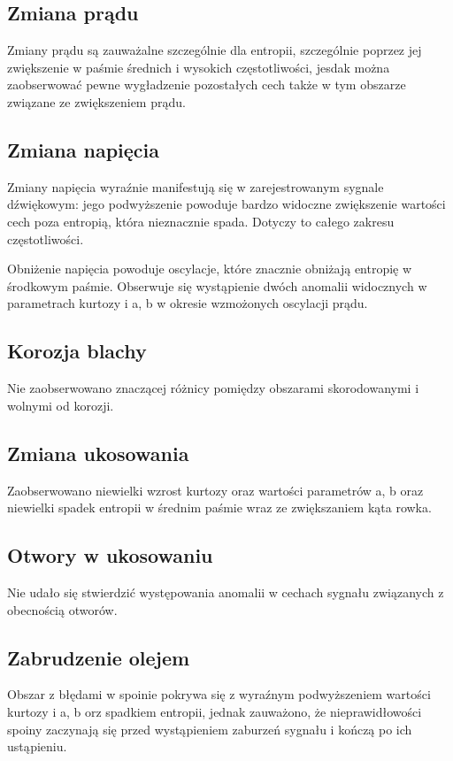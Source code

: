 \documentclass{mwart}
\begin{document}
	\subsection{Zmiana prądu}
Zmiany prądu są zauważalne szczególnie dla entropii, szczególnie poprzez jej zwiększenie w paśmie średnich i wysokich częstotliwości, jesdak można zaobserwować pewne wygładzenie pozostałych cech także w tym obszarze związane ze zwiększeniem prądu.
	
	
	\subsection{Zmiana napięcia}
	Zmiany napięcia wyraźnie manifestują się w zarejestrowanym sygnale dźwiękowym: jego podwyższenie powoduje bardzo widoczne zwiększenie wartości cech poza entropią, która nieznacznie spada. Dotyczy to całego zakresu częstotliwości.
	
	Obniżenie napięcia powoduje oscylacje, które znacznie obniżają entropię w środkowym paśmie. Obserwuje się wystąpienie dwóch anomalii widocznych w parametrach kurtozy i a, b w okresie wzmożonych oscylacji prądu.
	
	
	\subsection{Korozja blachy}
	Nie zaobserwowano znaczącej różnicy pomiędzy obszarami skorodowanymi i wolnymi od korozji.
	
	
	\subsection{Zmiana ukosowania}
	Zaobserwowano niewielki wzrost kurtozy oraz wartości parametrów a, b oraz niewielki spadek entropii w średnim paśmie wraz ze zwiększaniem kąta rowka.
	
	
	\subsection{Otwory w ukosowaniu}
	Nie udało się stwierdzić występowania anomalii w cechach sygnału związanych z obecnością otworów.
	
	
	\subsection{Zabrudzenie olejem}
	Obszar z błędami w spoinie pokrywa się z wyraźnym podwyższeniem wartości kurtozy i a, b orz spadkiem entropii, jednak zauważono, że nieprawidłowości spoiny zaczynają się przed wystąpieniem zaburzeń sygnału i kończą po ich ustąpieniu.
	
\end{document}
